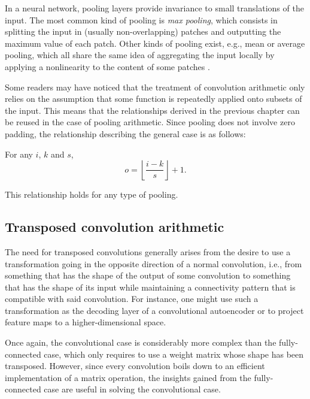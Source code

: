 In a neural network, pooling layers provide invariance to small translations of
the input. The most common kind of pooling is \emph{max pooling}, which
consists in splitting the input in (usually non-overlapping) patches and
outputting the maximum value of each patch. Other kinds of pooling exist, e.g.,
mean or average pooling, which all share the same idea of aggregating the input
locally by applying a nonlinearity to the content of some patches \citep{%
boureau-cvpr-10,boureau-icml-10,boureau-iccv-11,ICML2011Saxe_551}.

Some readers may have noticed that the treatment of convolution arithmetic only
relies on the assumption that some function is repeatedly applied onto subsets
of the input. This means that the relationships derived in the previous chapter
can be reused in the case of pooling arithmetic. Since pooling does not involve
zero padding, the relationship describing the general case is as follows:

\begin{relationship}\label{rel:pooling}
For any $i$, $k$ and $s$,
\begin{equation*}
    o = \left\lfloor \frac{i - k}{s} \right\rfloor + 1.
\end{equation*}
\end{relationship}

\noindent This relationship holds for any type of pooling.

\subsection{Transposed convolution arithmetic}\label{sec:transposed_conv}

The need for transposed convolutions generally arises from the desire to use a
transformation going in the opposite direction of a normal convolution, i.e.,
from something that has the shape of the output of some convolution to
something that has the shape of its input while maintaining a connectivity
pattern that is compatible with said convolution. For instance, one might use
such a transformation as the decoding layer of a convolutional autoencoder or to
project feature maps to a higher-dimensional space.

Once again, the convolutional case is considerably more complex than the
fully-connected case, which only requires to use a weight matrix whose shape
has been transposed. However, since every convolution boils down to an
efficient implementation of a matrix operation, the insights gained from the
fully-connected case are useful in solving the convolutional case.

